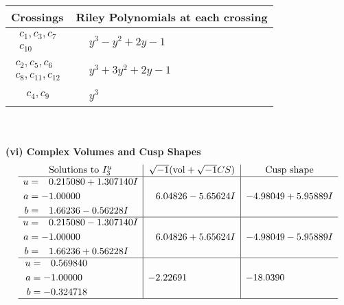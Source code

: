 \documentclass[1p]{elsarticle_modified}
\theoremstyle{definition}
\newcommand{\I}{\sqrt{-1}}
\begin{document}
\begin{tabular}{m{50pt}|m{274pt}}
Crossings & \hspace{64pt}Riley Polynomials at each crossing \\
\hline $$\begin{aligned}c_{1},c_{3},c_{7}\\c_{10}\end{aligned}$$&$\begin{aligned}
&y^3- y^2+2 y-1
\end{aligned}$\\
\hline $$\begin{aligned}c_{2},c_{5},c_{6}\\c_{8},c_{11},c_{12}\end{aligned}$$&$\begin{aligned}
&y^3+3 y^2+2 y-1
\end{aligned}$\\
\hline $$\begin{aligned}c_{4},c_{9}\end{aligned}$$&$\begin{aligned}
&y^3
\end{aligned}$\\
\hline
\end{tabular}\\~\\
\newpage\flushleft \textbf{(vi) Complex Volumes and Cusp Shapes}
$$\begin{array}{c|c|c}  
\text{Solutions to }I^u_{3}& \I (\text{vol} + \sqrt{-1}CS) & \text{Cusp shape}\\
 \hline 
\begin{aligned}
u &= \phantom{-}0.215080 + 1.307140 I \\
a &= -1.00000\phantom{ +0.000000I} \\
b &= \phantom{-}1.66236 - 0.56228 I\end{aligned}
 & \phantom{-}6.04826 - 5.65624 I & -4.98049 + 5.95889 I \\ \hline\begin{aligned}
u &= \phantom{-}0.215080 - 1.307140 I \\
a &= -1.00000\phantom{ +0.000000I} \\
b &= \phantom{-}1.66236 + 0.56228 I\end{aligned}
 & \phantom{-}6.04826 + 5.65624 I & -4.98049 - 5.95889 I \\ \hline\begin{aligned}
u &= \phantom{-}0.569840\phantom{ +0.000000I} \\
a &= -1.00000\phantom{ +0.000000I} \\
b &= -0.324718\phantom{ +0.000000I}\end{aligned}
 & -2.22691\phantom{ +0.000000I} & -18.0390\phantom{ +0.000000I}\\
 \hline 
 \end{array}$$\newpage\newpage\renewcommand{\arraystretch}{1}
\end{document}
